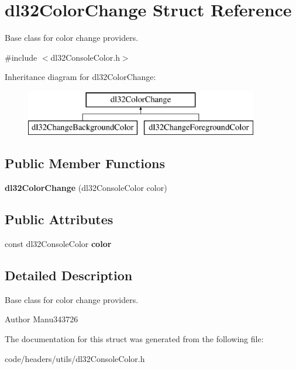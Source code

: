 \hypertarget{structdl32_color_change}{\section{dl32\-Color\-Change Struct Reference}
\label{structdl32_color_change}
}


Base class for color change providers.  




{\ttfamily \#include $<$dl32\-Console\-Color.\-h$>$}

Inheritance diagram for dl32\-Color\-Change\-:\begin{figure}[H]
\begin{center}
\leavevmode
\includegraphics[height=2.000000cm]{structdl32_color_change}
\end{center}
\end{figure}
\subsection*{Public Member Functions}
\begin{DoxyCompactItemize}
\item 
\hypertarget{structdl32_color_change_ab90507763d813f56ff39958fed0dfd3a}{{\bfseries dl32\-Color\-Change} (dl32\-Console\-Color color)}\label{structdl32_color_change_ab90507763d813f56ff39958fed0dfd3a}

\end{DoxyCompactItemize}
\subsection*{Public Attributes}
\begin{DoxyCompactItemize}
\item 
\hypertarget{structdl32_color_change_abe15f7e357ce5b4af470189aafd68746}{const dl32\-Console\-Color {\bfseries color}}\label{structdl32_color_change_abe15f7e357ce5b4af470189aafd68746}

\end{DoxyCompactItemize}


\subsection{Detailed Description}
Base class for color change providers. 

\begin{DoxyAuthor}{Author}
Manu343726 
\end{DoxyAuthor}


The documentation for this struct was generated from the following file\-:\begin{DoxyCompactItemize}
\item 
code/headers/utils/dl32\-Console\-Color.\-h\end{DoxyCompactItemize}
